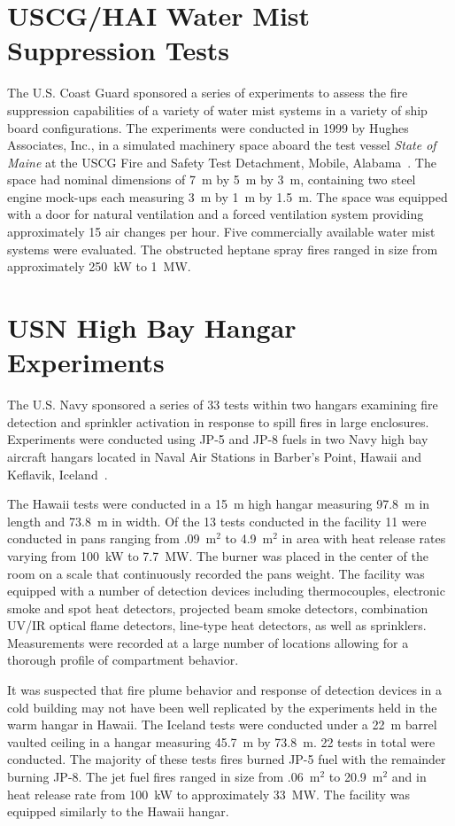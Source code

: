 \section{USCG/HAI Water Mist Suppression Tests}

The U.S. Coast Guard sponsored a series of experiments to assess the fire suppression capabilities of a variety of water mist systems in a variety of ship board configurations. The experiments were conducted in 1999 by Hughes Associates, Inc., in a simulated machinery space aboard the test vessel {\em State of Maine} at the USCG Fire and Safety Test Detachment, Mobile, Alabama~\cite{Back:USCG1999}. The space had nominal dimensions of 7~m by 5~m by 3~m, containing two steel engine mock-ups each measuring 3~m by 1~m by 1.5~m. The space was equipped with a door for natural ventilation and a forced ventilation system providing approximately 15 air changes per hour. Five commercially available water mist systems were evaluated. The obstructed heptane spray fires ranged in size from approximately 250~kW to 1~MW.



\section{USN High Bay Hangar Experiments}

The U.S. Navy sponsored a series of 33 tests within two hangars examining fire detection and sprinkler activation in response to spill fires in large enclosures. Experiments were conducted using JP-5 and JP-8 fuels in two Navy high bay aircraft hangars located in Naval Air Stations in Barber's Point, Hawaii and Keflavik, Iceland~\cite{Gott:1}.

The Hawaii tests were conducted in a 15~m high hangar measuring 97.8~m in length and 73.8~m in width. Of the 13 tests conducted in the facility 11 were conducted in pans ranging from .09~m$^2$ to 4.9~m$^2$ in area with heat release rates varying from 100~kW to 7.7~MW. The burner was placed in the center of the room on a scale that continuously recorded the pans weight. The facility was equipped with a number of detection devices including thermocouples, electronic smoke and spot heat detectors, projected beam smoke detectors, combination UV/IR optical flame detectors, line-type heat detectors, as well as sprinklers. Measurements were recorded at a large number of locations allowing for a thorough profile of compartment behavior.

It was suspected that fire plume behavior and response of detection devices in a cold building may not have been well replicated by the experiments held in the warm hangar in Hawaii. The Iceland tests were conducted under a 22~m barrel vaulted ceiling in a hangar measuring 45.7~m by 73.8~m. 22 tests in total were conducted. The majority of these tests fires burned JP-5 fuel with the remainder burning JP-8. The jet fuel fires ranged in size from .06~m$^2$ to 20.9~m$^2$ and in heat release rate from 100~kW to approximately 33~MW. The facility was equipped similarly to the Hawaii hangar.



